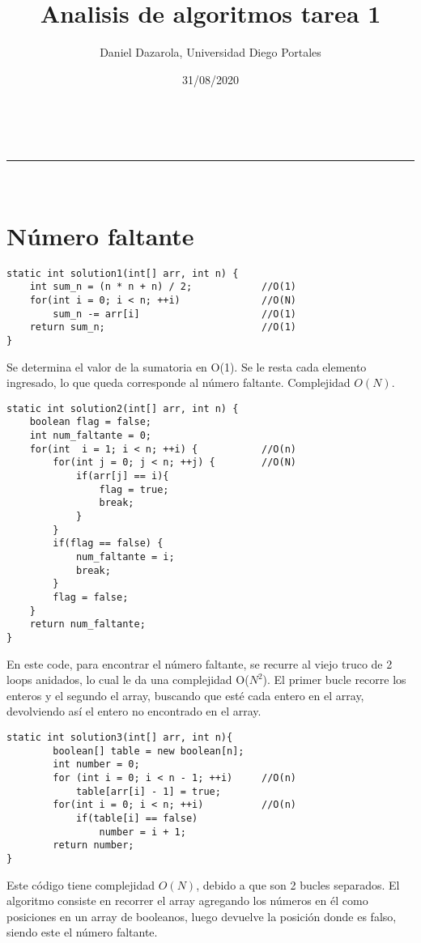\documentclass[a4paper,11pt]{article}
\makeatletter
\newcommand{\linia}{\rule{\linewidth}{0.5pt}}
\theoremstyle{mytheor}
\renewcommand{\maketitle}{
\begin{center}
\vspace{2ex}
{\huge \textsc{\@title}}
\vspace{1ex}
\\
\linia\\
\@author \hfill \@date
\vspace{4ex}
\end{center}
}
\makeatother
\begin{document}
\title{Analisis de algoritmos tarea 1}

\author{Daniel Dazarola, Universidad Diego Portales}

\date{31/08/2020}


\maketitle

\section*{Número faltante}

\begin{lstlisting}[label={list:first},caption=Solución 1.]
static int solution1(int[] arr, int n) {
	int sum_n = (n * n + n) / 2;			//O(1)
	for(int i = 0; i < n; ++i)				//O(N)
		sum_n -= arr[i]						//O(1)
	return sum_n;							//O(1)
}
\end{lstlisting}
Se determina el valor de la sumatoria en O(1). Se le resta cada elemento ingresado, lo que queda corresponde al número faltante. Complejidad $O(N)$.

\begin{lstlisting}[label={list:second},caption=Solución 2.]
static int solution2(int[] arr, int n) {
	boolean flag = false;
	int num_faltante = 0;
	for(int  i = 1; i < n; ++i) {			//O(n)
		for(int j = 0; j < n; ++j) {		//O(N)
			if(arr[j] == i){
				flag = true;
				break;
			}
		}
		if(flag == false) {
			num_faltante = i;
			break;
		}
		flag = false;
	}
	return num_faltante;
}
\end{lstlisting}
En este code, para encontrar el número faltante, se recurre al viejo truco de 2 loops anidados, lo cual le da una complejidad O($N^{2}$). El primer bucle recorre los enteros y el segundo el array, buscando que esté cada entero en el array, devolviendo así el entero no encontrado en el array.



\begin{lstlisting}[label={list:third},caption=Solución 3.]
static int solution3(int[] arr, int n){
        boolean[] table = new boolean[n];
        int number = 0;
        for (int i = 0; i < n - 1; ++i) 	//O(n)
            table[arr[i] - 1] = true; 
        for(int i = 0; i < n; ++i)			//O(n)
            if(table[i] == false) 
                number = i + 1;
        return number;
}
\end{lstlisting}
Este código tiene complejidad $O(N)$, debido a que son 2 bucles separados. El algoritmo consiste en recorrer el array agregando los números en él como posiciones en un array de booleanos, luego devuelve la posición donde es falso, siendo este el número faltante.
\end{document}
